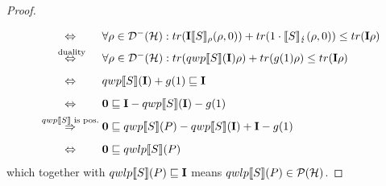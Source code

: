 \documentclass[a4paper,UKenglish,cleveref, autoref, thm-restate]{lipics-v2021}
\begin{document}
\begin{proof}
\begin{align*}
        &\overset{\phantom{qwp\llbracket S \rrbracket\text{ is pos.}}}{\Leftrightarrow} \forall \rho \in \density: tr(\identityOp\semanticsRho{S}(\rho,0)) + tr(1 \cdot \semanticsErr{S}(\rho,0)) \leq tr(\identityOp \rho)\\
        &\overset{\phantom{xs.s}\text{duality}\phantom{xss}}{\Leftrightarrow} \forall \rho \in \density: tr(\qwp{S}{\identityOp}\rho) + tr(g(1)\rho) \leq tr(\identityOp \rho)\\
        &\overset{\phantom{qwp\llbracket S \rrbracket\text{ is pos.}}}{\Leftrightarrow}\qwp{S}{\identityOp} + g(1) \sqsubseteq \identityOp \\
        &\overset{\phantom{qwp\llbracket S \rrbracket\text{ is pos.}}}{\Leftrightarrow} \zeroOp\sqsubseteq \identityOp - \qwp{S}{\identityOp}  - g(1) \\
        &\overset{qwp\llbracket S \rrbracket\text{ is pos.}}{\Rightarrow} \zeroOp\sqsubseteq \qwp{S}{P} - \qwp{S}{\identityOp} + \identityOp - g(1) \\
        &\overset{\phantom{qwp\llbracket S \rrbracket\text{ is pos.}}}{\Leftrightarrow} \zeroOp\sqsubseteq \qwlp{S}{P}
    \end{align*}
    which together with $qwlp\llbracket S \rrbracket (P)\sqsubseteq \textbf{I}$ means $qwlp\llbracket S \rrbracket (P)\in \mathcal{P}(\mathcal{H})$.


\end{proof}
\end{document}
